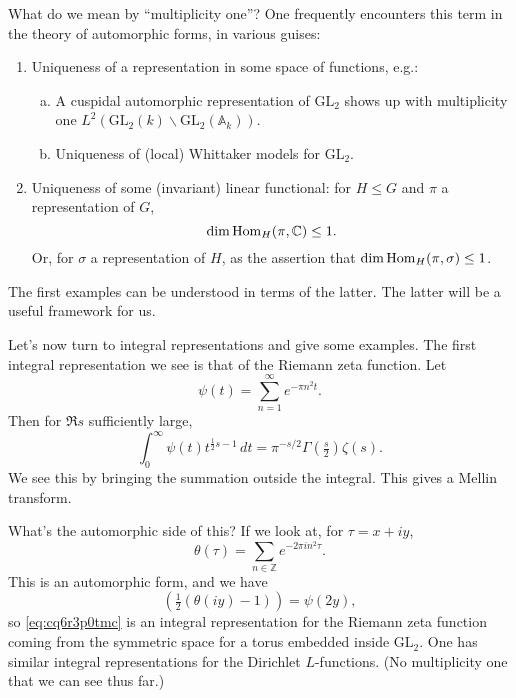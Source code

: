 \documentclass[reqno]{amsart} 
\begin{document}
What do we mean by ``multiplicity one''?  One frequently encounters this term in the theory of automorphic forms, in various guises:
\begin{enumerate}
\item\label{enumerate:cq6r3ndbhy} Uniqueness of a representation in some space of functions, e.g.:
  \begin{enumerate}[(a)]
  \item\label{enumerate:cq6r3m96yd} A cuspidal automorphic representation of $\mathrm{GL}_2$ shows up with multiplicity one $L^2(\mathrm{GL}_2(k) \backslash \mathrm{GL}_2(\mathbb{A}_k))$.
  \item\label{enumerate:cq6r3m98gf} Uniqueness of (local) Whittaker models for $\mathrm{GL}_2$.
  \end{enumerate}
\item\label{enumerate:cq6r3ndama} Uniqueness of some (invariant) linear functional: for $H \leq G$ and $\pi$ a representation of $G$,
  \begin{equation*}
    \dim \operatorname{Hom}_H(\pi, \mathbb{C}) \leq 1.
  \end{equation*}
  Or, for $\sigma$ a representation of $H$, as the assertion that $\dim \operatorname{Hom}_H(\pi, \sigma) \leq 1$.
\end{enumerate}
The first examples can be understood in terms of the latter.  The latter will be a useful framework for us.

Let's now turn to integral representations and give some examples.  The first integral representation we see is that of the Riemann zeta function.  Let
\begin{equation}\label{eq:cq6r3qe33m}
  \psi(t) = \sum_{n = 1}^\infty e^{- \pi n^2 t}.
\end{equation}
Then for $\Re s$ sufficiently large,
\begin{equation}\label{eq:cq6r3p0tmc}
  \int_0^\infty \psi(t) t^{\frac{1}{2} s - 1} \, d t
  = \pi^{- s/2} \Gamma(\tfrac{s}{2}) \zeta(s).
\end{equation}
We see this by bringing the summation outside the integral.  This gives a Mellin transform.

What's the automorphic side of this?  If we look at, for $\tau = x + i y$,
\begin{equation*}
  \theta(\tau) = \sum_{n \in \mathbb{Z}} e^{- 2 \pi i n^2 \tau}.
\end{equation*}
This is an automorphic form, and we have
\begin{equation*}
  (\tfrac{1}{2}(\theta(i y) - 1)) = \psi(2 y),
\end{equation*}
so \eqref{eq:cq6r3p0tmc} is an integral representation for the Riemann zeta function coming from the symmetric space for a torus embedded inside $\mathrm{GL}_2$.  One has similar integral representations for the Dirichlet $L$-functions.  (No multiplicity one that we can see thus far.)
\end{document}
